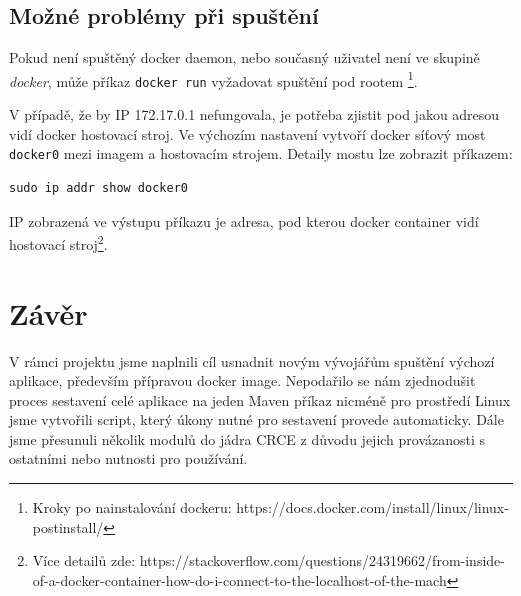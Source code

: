 \documentclass[12pt, a4paper]{article}
\begin{document}
\subsection{Možné problémy při spuštění}
Pokud není spuštěný docker daemon, nebo současný uživatel není ve skupině \textit{docker}, může příkaz \verb|docker run| vyžadovat spuštění pod rootem \footnote{Kroky po nainstalování dockeru: https://docs.docker.com/install/linux/linux-postinstall/}.

V případě, že by IP 172.17.0.1 nefungovala, je potřeba zjistit pod jakou adresou vidí docker hostovací stroj. Ve výchozím nastavení vytvoří docker síťový most \verb|docker0| mezi imagem a hostovacím strojem. Detaily mostu lze zobrazit příkazem: 

\begin{verbatim}
sudo ip addr show docker0
\end{verbatim}

IP zobrazená ve výstupu příkazu je adresa, pod kterou docker container vidí hostovací stroj\footnote{Více detailů zde: https://stackoverflow.com/questions/24319662/from-inside-of-a-docker-container-how-do-i-connect-to-the-localhost-of-the-mach}.

\newpage
\section{Závěr}  %

V rámci projektu jsme naplnili cíl usnadnit novým vývojářům spuštění výchozí aplikace, především přípravou docker image. Nepodařilo se nám zjednodušit proces sestavení celé aplikace na jeden Maven příkaz nicméně pro prostředí Linux jsme vytvořili script, který úkony nutné pro sestavení provede automaticky.
Dále jsme přesunuli několik modulů do jádra CRCE z důvodu jejich provázanosti s ostatními nebo nutnosti pro používání. 
\end{document}
